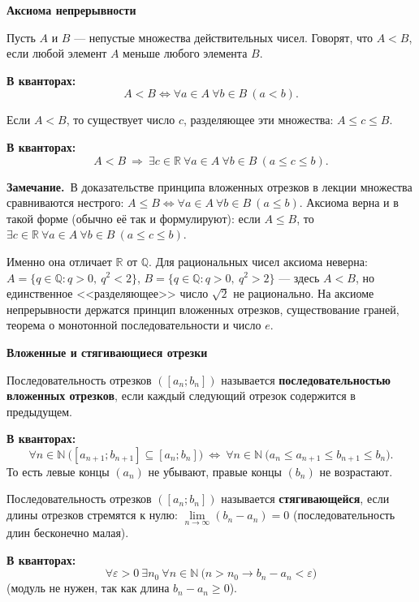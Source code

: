 \documentclass[a4paper,11pt]{article}
\newcommand{\N}{\mathbb{N}}
\newcommand{\R}{\mathbb{R}}
\newcommand{\eps}{\varepsilon}
\newcommand{\kv}{\par\noindent\textbf{\textcolor{oprc!85!black}{В кванторах:}}}
\newcommand{\zam}{\par\smallskip\noindent\textbf{\textcolor{zamc}{Замечание.}}\ }
\newcommand{\podr}[1]{\par\needspace{8\baselineskip}\medskip
  {\large\bfseries\textcolor{oprc!80!black}{#1}}\par\nopagebreak\smallskip}
\begin{document}
\podr{Аксиома непрерывности}

\begin{opr}
Пусть $A$ и $B$ --- непустые множества действительных чисел. Говорят, что $A < B$, если любой элемент $A$ меньше любого элемента $B$.
\kv
\[
  A < B \Leftrightarrow \forall a \in A\ \forall b \in B\ (a < b).
\]
\end{opr}

\begin{opr}
Если $A < B$, то существует число $c$, разделяющее эти множества: $A \le c \le B$.
\kv
\[
  A < B \ \Longrightarrow\ \exists c \in \R\ \forall a \in A\ \forall b \in B\ (a \le c \le b).
\]
\end{opr}

\zam В доказательстве принципа вложенных отрезков в лекции множества сравниваются нестрого:
$A \le B \Leftrightarrow \forall a \in A\ \forall b \in B\ (a \le b)$. Аксиома верна и в такой форме
(обычно её так и формулируют): если $A \le B$, то $\exists c \in \R\ \forall a \in A\ \forall b \in B\ (a \le c \le b)$.

\begin{dop}
Именно она отличает $\R$ от $\mathbb{Q}$. Для рациональных чисел аксиома неверна:
$A = \{q \in \mathbb{Q} : q > 0,\ q^2 < 2\}$, $B = \{q \in \mathbb{Q} : q > 0,\ q^2 > 2\}$ --- здесь $A < B$,
но единственное <<разделяющее>> число $\sqrt2$ не рационально. На аксиоме непрерывности держатся принцип вложенных
отрезков, существование граней, теорема о монотонной последовательности и число $e$.
\end{dop}

\podr{Вложенные и стягивающиеся отрезки}

\begin{opr}
Последовательность отрезков $([a_n; b_n])$ называется \textbf{последовательностью вложенных отрезков}, если каждый следующий
отрезок содержится в предыдущем.
\kv
\[
  \forall n \in \N\ \bigl([a_{n+1}; b_{n+1}] \subseteq [a_n; b_n]\bigr)
  \ \Leftrightarrow\ \forall n \in \N\ \bigl(a_n \le a_{n+1} \le b_{n+1} \le b_n\bigr).
\]
То есть левые концы $(a_n)$ не убывают, правые концы $(b_n)$ не возрастают.
\end{opr}

\begin{opr}
Последовательность отрезков $([a_n; b_n])$ называется \textbf{стягивающейся}, если длины отрезков стремятся к нулю:
$\lim\limits_{n \to \infty} (b_n - a_n) = 0$ (последовательность длин бесконечно малая).
\kv
\[
  \forall \eps > 0\ \exists n_0\ \forall n \in \N\ \bigl(n > n_0 \to b_n - a_n < \eps\bigr)
\]
(модуль не нужен, так как длина $b_n - a_n \ge 0$).
\end{opr}
\end{document}
